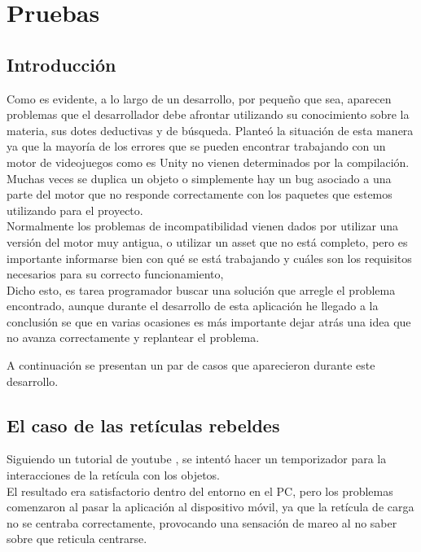 \section{Pruebas}

\subsection{Introducción}

\quad Como es evidente, a lo largo de un desarrollo, por pequeño que sea, aparecen problemas que el desarrollador debe afrontar utilizando su conocimiento sobre la materia, sus dotes deductivas y de búsqueda. Planteó la situación de esta manera ya que la mayoría de los errores que se pueden encontrar trabajando con un motor de videojuegos como es Unity no vienen determinados por la compilación. Muchas veces se duplica un objeto o simplemente hay un bug asociado a una parte del motor que no responde correctamente con los paquetes que estemos utilizando para el proyecto.\\

\quad Normalmente los problemas de incompatibilidad vienen dados por utilizar una versión del motor muy antigua, o utilizar un asset que no está completo, pero es importante informarse bien con qué se está trabajando y cuáles son los requisitos necesarios para su correcto funcionamiento,\\

\quad Dicho esto, es tarea programador buscar una solución que arregle el problema encontrado, aunque durante el desarrollo de esta aplicación he llegado a la conclusión se que en varias ocasiones es más importante dejar atrás una idea que no avanza correctamente y replantear el problema.\

\quad A continuación se presentan un par de casos que aparecieron durante este desarrollo.\\

\subsection{El caso de las retículas rebeldes}\label{7.2}

\quad Siguiendo un tutorial de youtube \cite{You}, se intentó hacer un temporizador para la interacciones de la retícula con los objetos.\\

\quad El resultado era satisfactorio dentro del entorno en el PC, pero los problemas comenzaron al pasar la aplicación al dispositivo móvil, ya que la retícula de carga no se centraba correctamente, provocando una sensación de mareo al no saber sobre que reticula centrarse.\\

